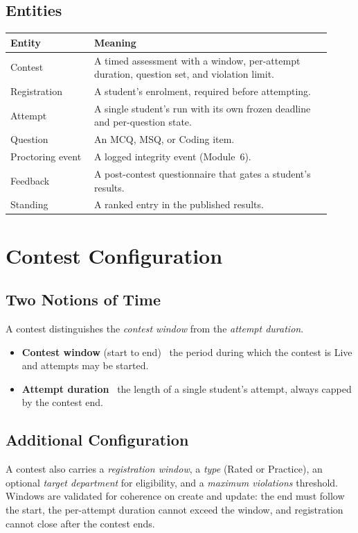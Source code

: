 \documentclass[12pt,a4paper,oneside]{report}
\begin{document}
\section{Entities}
\begin{longtable}{@{}p{0.24\linewidth} p{0.68\linewidth}@{}}
\toprule
\textbf{Entity} & \textbf{Meaning}\\
\midrule
\endhead
Contest & A timed assessment with a window, per-attempt duration, question set, and violation limit.\\
Registration & A student's enrolment, required before attempting.\\
Attempt & A single student's run with its own frozen deadline and per-question state.\\
Question & An MCQ, MSQ, or Coding item.\\
Proctoring event & A logged integrity event (Module~6).\\
Feedback & A post-contest questionnaire that gates a student's results.\\
Standing & A ranked entry in the published results.\\
\bottomrule
\end{longtable}

\chapter{Contest Configuration}
\section{Two Notions of Time}
A contest distinguishes the \emph{contest window} from the \emph{attempt
duration}.
\begin{itemize}[leftmargin=1.5em]
  \item \textbf{Contest window} (start to end) \textemdash\ the period during
        which the contest is Live and attempts may be started.
  \item \textbf{Attempt duration} \textemdash\ the length of a single student's
        attempt, always capped by the contest end.
\end{itemize}

\section{Additional Configuration}
A contest also carries a \emph{registration window}, a \emph{type} (Rated or
Practice), an optional \emph{target department} for eligibility, and a
\emph{maximum violations} threshold. Windows are validated for coherence on
create and update: the end must follow the start, the per-attempt duration cannot
exceed the window, and registration cannot close after the contest ends.
\end{document}
